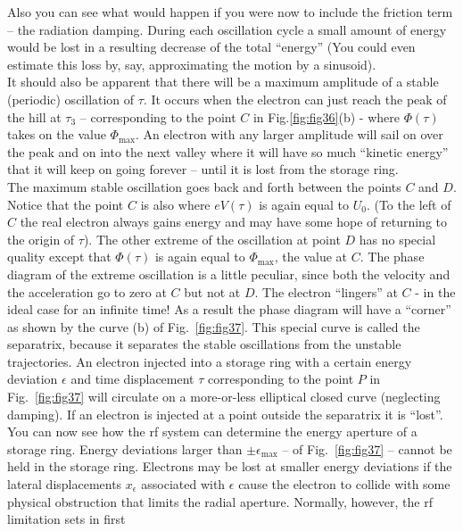 Also you can see what would happen if you were now to include the friction term -- the radiation
 damping. During each oscillation cycle a small amount of energy would be lost in a resulting decrease of the total ``energy'' (You could even estimate this loss by, say, approximating the motion by a sinusoid).\\
It should also be apparent that there will be a maximum amplitude of a stable (periodic) oscillation of $\tau$. It occurs when the electron can just reach the peak of the hill at $\tau_3$ -- corresponding to the point $C$ in Fig.\ref{fig:fig36}(b) - where $\Phi(\tau)$ takes on the value $\Phi_\text{max}$. An electron with any larger amplitude will sail on over the peak
and on into the next valley where it will have so much ``kinetic energy'' that it will keep on going forever -- until it is lost from the storage ring.\\
The maximum stable oscillation goes back and forth between the points $C$ and $D$. Notice that the point $C$ is also where $eV(\tau)$ is again equal to $U_0$. (To the left of $C$ the real electron always gains energy and may have some hope of returning to the origin of $\tau$). The other extreme of the oscillation at point $D$ has no special quality except that $\Phi(\tau)$ is again equal to $\Phi_\text{max}$, the value at $C$. The phase diagram of the extreme oscillation
 is a little peculiar, since both the velocity and the acceleration go to zero at $C$ but not at $D$.  The electron ``lingers'' at $C$ - in the ideal case for an infinite time! As a result the phase diagram will have a ``corner'' as shown by the curve (b) of Fig.~\ref{fig:fig37}. This special curve is called the separatrix, because it separates the stable oscillations from the unstable trajectories. An electron injected into a storage ring with a certain energy deviation $\epsilon$ and time displacement $\tau$ corresponding to the point $P$ in Fig.~\ref{fig:fig37} will circulate on a more-or-less elliptical closed curve (neglecting damping). If an electron is injected at a point outside the separatrix it is ``lost''.\\
 You can now see how the rf system can determine the energy aperture of a storage ring. Energy deviations larger than $\pm\epsilon_\text{max}$ -- of Fig.~\ref{fig:fig37} -- cannot be held in the storage ring. Electrons may be lost at smaller energy deviations if the lateral displacements
 $x_\epsilon$ associated with $\epsilon$ cause the electron to collide with some physical obstruction that limits the radial aperture. Normally, however, the rf limitation sets in first
